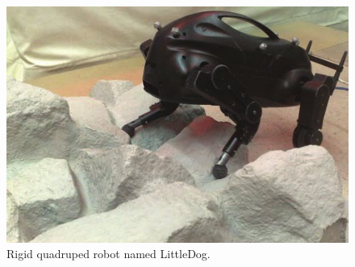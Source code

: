 \begin{figure}[ht]
    \centering
    \includegraphics[width=0.6\linewidth]{img/chap2/LittleDog.jpg}
    \caption{Rigid quadruped robot named LittleDog\cite{kalakrishnanFastRobustQuadruped2010}.}
    \label{fig:LittleDog}
\end{figure}
